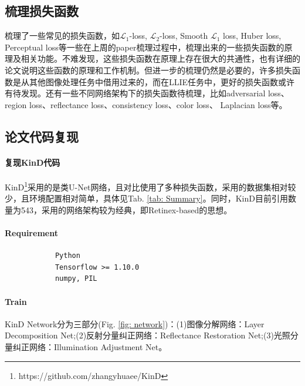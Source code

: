 \documentclass[letterpaper,12pt]{article}
\begin{document}
		\subsection{梳理损失函数}
			
		梳理了一些常见的损失函数，如$\mathcal{L}_1$-loss, $\mathcal{L}_2$-loss, Smooth $\mathcal{L}_1$ loss, Huber loss, Perceptual loss等一些在上周的paper梳理过程中，梳理出来的一些损失函数的原理及相关功能。不难发现，这些损失函数在原理上存在很大的共通性，也有详细的论文说明这些函数的原理和工作机制。但进一步的梳理仍然是必要的，许多损失函数是从其他图像处理任务中借用过来的，而在LLIE任务中，更好的损失函数或许有待发现。还有一些不同网络架构下的损失函数待梳理，比如adversarial loss、region loss、reflectance loss、consistency loss、color loss、 Laplacian loss等。
		
	
		\subsection{论文代码复现}
		
		\paragraph{复现KinD代码}
		
		KinD\footnote{https://github.com/zhangyhuaee/KinD}采用的是类U-Net网络，且对比使用了多种损失函数，采用的数据集相对较少，且环境配置相对简单，具体见Tab. \ref{tab: Summary}。同时，KinD\cite{10.1145/3343031.3350926}目前引用数量为543，采用的网络架构较为经典，即Retinex-based的思想。
		
		\paragraph{Requirement}
		
		\lstset{language=python,breaklines=true}
		\begin{lstlisting}
			Python
			Tensorflow >= 1.10.0
			numpy, PIL
		\end{lstlisting}
		
		\paragraph{Train}
		
		KinD Network分为三部分(Fig. \ref{fig: network})：(1)图像分解网络：Layer Decomposition Net;(2)反射分量纠正网络：Reflectance Restoration Net;(3)光照分量纠正网络：Illumination Adjustment Net。
		
\end{document}
